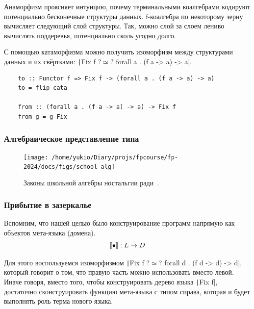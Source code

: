 Анаморфизм проясняет интуицию, почему терминальными коалгебрами кодируют потенциально бесконечные структуры данных.
f-коалгебра по некоторому зерну вычисляет следующий слой структуры.
Так, можно слой за слоем лениво вычислять поддеревья, потенциально сколь угодно долго.

С помощью катаморфизма можно получить изоморфизм между структурами данных и их свёртками:
\texttt|Fix f ?$\simeq$? forall a . (f a -> a) -> a|.
\begin{verbatim}
    to :: Functor f => Fix f -> (forall a . (f a -> a) -> a)
    to = flip cata

    from :: (forall a . (f a -> a) -> a) -> Fix f
    from g = g Fix
\end{verbatim}


\subsubsection{Алгебраическое представление типа}

\begin{figure}[h!]
    \centering
    \texttt{[image: /home/yukio/Diary/projs/fpcourse/fp-2024/docs/figs/school-alg]}
    \caption{Законы школьной алгебры ностальгии ради~\cite{hinze2010reason}.}
    \label{fig:school-alg}
\end{figure}


\cite[глава 1]{maguire-types}



\subsubsection{Прибытие в зазеркалье}

Вспомним, что нашей целью было конструирование программ напрямую как объектов мета-языка (домена).
\[
    \llbracket{\bullet}\rrbracket : L \to D
\]

Для этого воспользуемся изоморфизмом
\texttt|Fix f ?$\simeq$? forall d . (f d -> d) -> d|, который говорит о том, что правую часть можно использовать вместо левой.
Иначе говоря, вместо того, чтобы конструировать дерево языка \texttt|Fix f|, достаточно сконструировать функцию мета-языка с типом справа, которая и будет выполнять роль терма нового языка.


